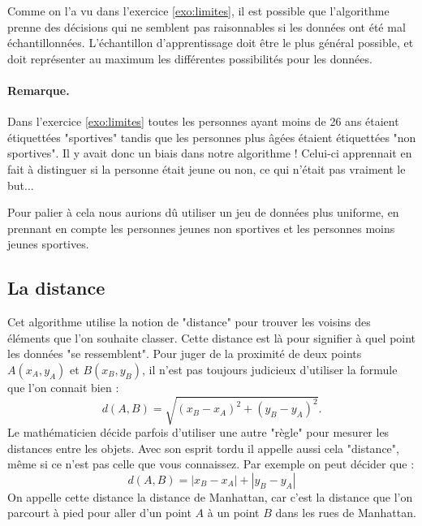 \documentclass[12pt]{article}                   %
\theoremstyle{exercicestyle}
\theoremstyle{break2}
\theoremstyle{break3}
\begin{document}
Comme on l'a vu dans l'exercice \ref{exo:limites}, il est possible que l'algorithme prenne des décisions qui ne semblent pas raisonnables si les données ont été mal échantillonnées. L'échantillon d'apprentissage doit être le plus général possible, et doit représenter au maximum les différentes possibilités pour les données. 

\paragraph{Remarque.} Dans l'exercice \ref{exo:limites} toutes les personnes ayant moins de 26 ans étaient étiquettées "sportives" tandis que les personnes plus âgées étaient étiquettées "non sportives". Il y avait donc un biais dans notre algorithme ! Celui-ci apprennait en fait à distinguer si la personne était jeune ou non, ce qui n'était pas vraiment le but... 

Pour palier à cela nous aurions dû utiliser un jeu de données plus uniforme, en prennant en compte les personnes jeunes non sportives et les personnes moins jeunes sportives. 

\subsection{La distance}

Cet algorithme utilise la notion de "distance" pour trouver les voisins des éléments que l'on souhaite classer. Cette distance est là pour signifier à quel point les données "se ressemblent". Pour juger de la proximité de deux points $A(x_A, y_A)$ et $B(x_B, y_B)$, il n'est pas toujours judicieux d'utiliser la formule que l'on connait bien :
$$ 
d(A, B) = \sqrt{(x_B - x_A)^2 + (y_B-y_A)^2}.
$$
Le mathématicien décide parfois d'utiliser une autre "règle" pour mesurer les distances entre les objets. Avec son esprit tordu il appelle aussi cela "distance", même si ce n'est pas celle que vous connaissez. Par exemple on peut décider que :
$$ 
d(A, B) = |x_B - x_A| + |y_B - y_A|
$$
On appelle cette distance la distance de Manhattan, car c'est la distance que l'on parcourt à pied pour aller d'un point $A$ à un point $B$ dans les rues de Manhattan.
\end{document}

